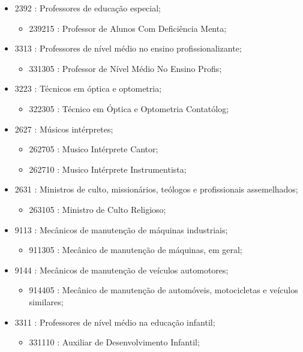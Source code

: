 \begin{itemize}
\begin{itemize}
\begin{itemize}
    \end{itemize}
    \item 2392 : Professores de educação especial;
    \begin{itemize}
      \item 239215 : Professor de Alunos Com Deficiência Menta;
    \end{itemize}
    \item 3313 : Professores de nível médio no ensino profissionalizante;
    \begin{itemize}
      \item 331305 : Professor de Nível Médio No Ensino Profis;
    \end{itemize}
    \item 3223 : Técnicos em óptica e optometria;
    \begin{itemize}
      \item 322305 : Técnico em Óptica e Optometria Contatólog;
    \end{itemize}
    \item 2627 : Músicos intérpretes;
    \begin{itemize}
      \item 262705 : Musico Intérprete Cantor;
      \item 262710 : Musico Intérprete Instrumentista;
    \end{itemize}
    \item 2631 : Ministros de culto, missionários, teólogos e profissionais assemelhados;
    \begin{itemize}
      \item 263105 : Ministro de Culto Religioso;
    \end{itemize}
    \item 9113 : Mecânicos de manutenção de máquinas industriais;
    \begin{itemize}
      \item 911305 : Mecânico de manutenção de máquinas, em geral;
    \end{itemize}
    \item 9144 : Mecânicos de manutenção de veículos automotores;
    \begin{itemize}
      \item 914405 : Mecânico de manutenção de automóveis, motocicletas e veículos similares;
    \end{itemize}
    \item 3311 : Professores de nível médio na educação infantil;
    \begin{itemize}
      \item 331110 : Auxiliar de Desenvolvimento Infantil;

\end{itemize}
\end{itemize}
\end{itemize}
